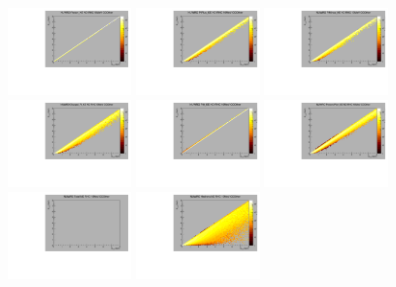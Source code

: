\begin{center}

  \includegraphics[width=0.245\textwidth]{plots/response_matrix/Proton_KE_RHC_CCOther_10MeV.pdf}
  \includegraphics[width=0.245\textwidth]{plots/response_matrix/PiPlus_KE_RHC_CCOther_10MeV.pdf}
  \includegraphics[width=0.245\textwidth]{plots/response_matrix/PiMinus_KE_RHC_CCOther_10MeV.pdf}
  \includegraphics[width=0.245\textwidth]{plots/response_matrix/Charged_Pi_KE_RHC_CCOther_10MeV.pdf}
  \includegraphics[width=0.245\textwidth]{plots/response_matrix/Pi0_KE_RHC_CCOther_10MeV.pdf}
  \includegraphics[width=0.245\textwidth]{plots/response_matrix/Proton+Pion_KE_RHC_CCOther_10MeV.pdf}
  \includegraphics[width=0.245\textwidth]{plots/response_matrix/Total_RHC_CCOther_10MeV.pdf}
  \includegraphics[width=0.245\textwidth]{plots/response_matrix/Hadrons_RHC_CCOther_10MeV.pdf}

\end{center}

